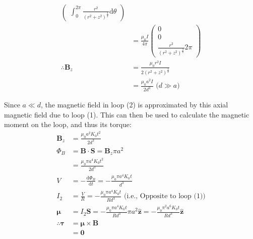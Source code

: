 \documentclass[a4paper]{scrartcl}
\begin{document}
\begin{align*}
\begin{pmatrix}
        \int_0^{2 \pi} \frac{r^2}{(r^2 + z^2)^{\frac{3}{2}}} \mathrm{d}\theta
    \end{pmatrix} \\
    &= \frac{\mu_0 I}{4 \pi} \begin{pmatrix}
        0 \\
        0 \\
        \frac{r^2}{(r^2 + z^2)^{\frac{3}{2}}} 2 \pi
    \end{pmatrix} \\
    \therefore \mathbf{B}_z &= \frac{\mu_0 r^2 I}{2 (r^2 + z^2)^{\frac{3}{2}}} \\
    &= \frac{\mu_0 a^2 I}{2 d^3} \text{ (\(d \gg a\))}
\end{align*}

Since \(a \ll d\), the magnetic field in loop (2) is approximated by this axial magnetic field due to loop (1). This can then be used to calculate the magnetic moment on the loop, and thus its torque:
\begin{align*}
    \mathbf{B}_z &= \frac{\mu_0 a^2 K_0 t^2}{2 d^3} \\
    \Phi_B &= \mathbf{B} \cdot \mathbf{S} = \mathbf{B}_z \pi a^2 \\
    &= \frac{\mu_0 \pi a^4 K_0 t^2}{2 d^3} \\
    V &= -\frac{\mathrm{d}\Phi_B}{\mathrm{d}t} = -\frac{\mu_0 \pi a^4 K_0 t}{d^3} \\
    I_2 &= \frac{V}{R} = -\frac{\mu_0 \pi a^4 K_0 t}{R d^3} \text{ (i.e., Opposite to loop (1))} \\
    \boldsymbol{\mu} &= I_2 \mathbf{S} = -\frac{\mu_0 \pi a^4 K_0 t}{R d^3} \pi a^2 \hat{\mathbf{z}} = -\frac{\mu_0 \pi^2 a^6 K_0 t}{R d^3} \hat{\mathbf{z}} \\
    \therefore \boldsymbol{\tau} &= \boldsymbol{\mu} \times \mathbf{B} \\
    &= \mathbf{0}
\end{align*}
\end{document}
